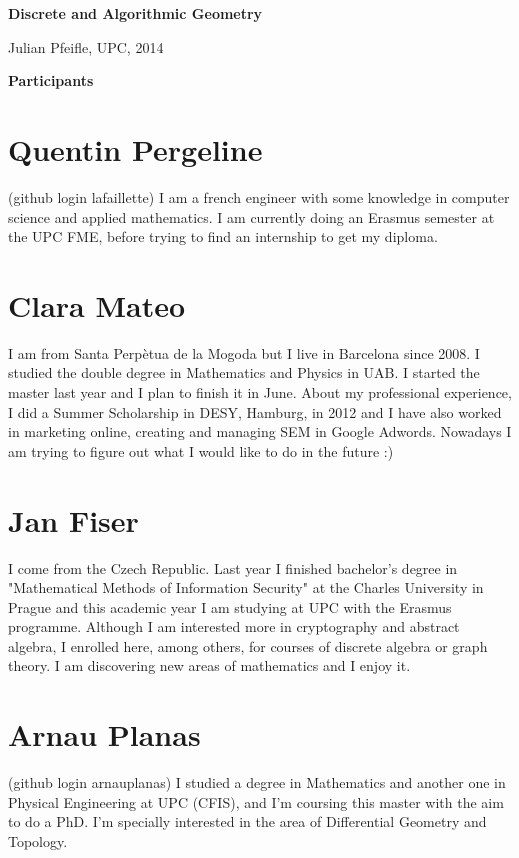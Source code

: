 \documentclass[11pt]{amsart}
\begin{document}
\begin{center}
\textbf{\sffamily
   Discrete and Algorithmic Geometry }

\medskip
   Julian Pfeifle,
   UPC, 2014 \mbox{}
\end{center}

\bigskip

\begin{center}
  \textbf{\sffamily Participants}
\end{center}

\medskip

\section*{Quentin Pergeline}
(github login lafaillette) I am a french engineer with some knowledge in computer science and applied mathematics.
I am currently doing an Erasmus semester at the UPC FME, before trying to find an internship to get my diploma.
\medskip

\section*{Clara Mateo}
I am from Santa Perp\`etua de la Mogoda but I live in Barcelona since 2008. I studied the double degree in Mathematics and Physics in UAB. I started the master last year and I plan to finish it in June. About my professional experience, I did a Summer Scholarship in DESY, Hamburg, in 2012 and I have also worked in marketing online, creating and managing SEM in Google Adwords. Nowadays I am trying to figure out what I would like to do in the future :)
\medskip


\section*{Jan Fiser}
I come from the Czech Republic. Last year I finished bachelor's degree in "Mathematical Methods of Information Security" at the Charles University in Prague and this academic year I am studying at UPC with the Erasmus programme.
Although I am interested more in cryptography and abstract algebra, I enrolled here, among others, for courses of discrete algebra or graph theory. I am discovering new areas of mathematics and I enjoy it.
\medskip

\section*{Arnau Planas}
(github login arnauplanas) I studied a degree in Mathematics and another one in Physical Engineering at UPC (CFIS), 
and I'm coursing this master with the aim to do a PhD. 
I'm specially interested in the area of Differential Geometry and Topology.
\medskip
\end{document}
